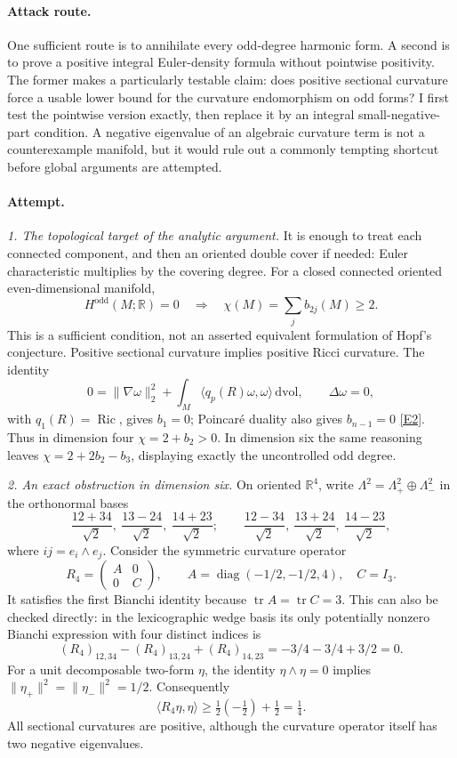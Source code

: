 \documentclass[11pt,a4paper]{article}
\newcommand{\R}{\mathbb{R}}
\newcommand{\eref}[2]{\hyperlink{extra:#1:#2}{[E#2]}}
\begin{document}
\paragraph{Attack route.}
One sufficient route is to annihilate every odd-degree harmonic form. A second
is to prove a positive integral Euler-density formula without pointwise
positivity. The former makes a particularly testable claim: does positive
sectional curvature force a usable lower bound for the curvature endomorphism
on odd forms? I first test the pointwise version exactly, then replace it by
an integral small-negative-part condition. A negative eigenvalue of an
algebraic curvature term is not a counterexample manifold, but it would rule
out a commonly tempting shortcut before global arguments are attempted.

\paragraph{Attempt.}
\textit{1. The topological target of the analytic argument.}
It is enough to treat each connected component, and then an oriented double
cover if needed: Euler characteristic multiplies by the covering degree.
For a closed connected oriented even-dimensional manifold,
\[
 H^{\mathrm{odd}}(M;\R)=0\quad\Longrightarrow\quad
 \chi(M)=\sum_j b_{2j}(M)\ge2.
\]
This is a sufficient condition, not an asserted equivalent formulation of
Hopf's conjecture. Positive sectional curvature implies positive Ricci
curvature. The identity
\[
 0=\|\nabla\omega\|_2^2+
   \int_M\langle q_p(R)\omega,\omega\rangle\,\mathrm{dvol},
 \qquad \Delta\omega=0,
\]
with $q_1(R)=\operatorname{Ric}$, gives $b_1=0$; Poincar\'e duality also gives
$b_{n-1}=0$ \eref{statement}{2}. Thus in dimension four
$\chi=2+b_2>0$. In dimension six the same reasoning leaves
$\chi=2+2b_2-b_3$, displaying exactly the uncontrolled odd degree.

\textit{2. An exact obstruction in dimension six.}
On oriented $\R^4$, write $\Lambda^2=\Lambda^2_+\oplus\Lambda^2_-$ in the
orthonormal bases
\[
 \frac{12+34}{\sqrt2},\ \frac{13-24}{\sqrt2},\
 \frac{14+23}{\sqrt2};\qquad
 \frac{12-34}{\sqrt2},\ \frac{13+24}{\sqrt2},\
 \frac{14-23}{\sqrt2},
\]
where $ij=e_i\wedge e_j$. Consider the symmetric curvature operator
\[
 R_4=\begin{pmatrix}A&0\\0&C\end{pmatrix},\qquad
 A=\operatorname{diag}(-1/2,-1/2,4),\quad C=I_3.
\]
It satisfies the first Bianchi identity because $\operatorname{tr}A=
\operatorname{tr}C=3$. This can also be checked directly: in the lexicographic
wedge basis its only potentially nonzero Bianchi expression with four
distinct indices is
\[
 (R_4)_{12,34}-(R_4)_{13,24}+(R_4)_{14,23}
 =-3/4-3/4+3/2=0.
\]
For a unit decomposable two-form $\eta$, the identity
$\eta\wedge\eta=0$ implies $\|\eta_+\|^2=\|\eta_-\|^2=1/2$.
Consequently
\[
 \langle R_4\eta,\eta\rangle\ge\tfrac12(-\tfrac12)+\tfrac12=\tfrac14.
\]
All sectional curvatures are positive, although the curvature operator itself
has two negative eigenvalues.
\end{document}
